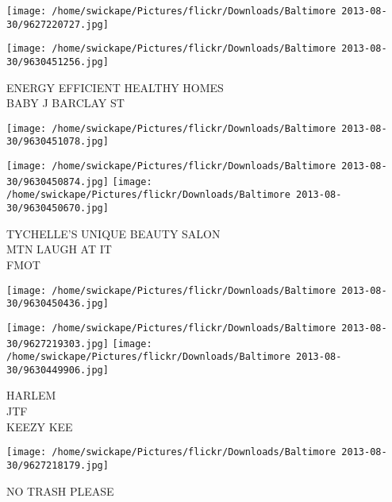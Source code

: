 \documentclass[10pt,letterpaper]{article}
\begin{document}
\texttt{[image: /home/swickape/Pictures/flickr/Downloads/Baltimore 2013-08-30/9627220727.jpg]}

\vspace{0.25in}
\texttt{[image: /home/swickape/Pictures/flickr/Downloads/Baltimore 2013-08-30/9630451256.jpg]}

ENERGY EFFICIENT HEALTHY HOMES\\
BABY J BARCLAY ST\\
\pagebreak

\texttt{[image: /home/swickape/Pictures/flickr/Downloads/Baltimore 2013-08-30/9630451078.jpg]}

\vspace{0.25in}
\texttt{[image: /home/swickape/Pictures/flickr/Downloads/Baltimore 2013-08-30/9630450874.jpg]}
\texttt{[image: /home/swickape/Pictures/flickr/Downloads/Baltimore 2013-08-30/9630450670.jpg]}

TYCHELLE'S UNIQUE BEAUTY SALON\\
MTN LAUGH AT IT\\
FMOT\\
\pagebreak

\texttt{[image: /home/swickape/Pictures/flickr/Downloads/Baltimore 2013-08-30/9630450436.jpg]}

\vspace{0.25in}
\texttt{[image: /home/swickape/Pictures/flickr/Downloads/Baltimore 2013-08-30/9627219303.jpg]}
\texttt{[image: /home/swickape/Pictures/flickr/Downloads/Baltimore 2013-08-30/9630449906.jpg]}

HARLEM\\
JTF\\
KEEZY KEE\\
\pagebreak

\texttt{[image: /home/swickape/Pictures/flickr/Downloads/Baltimore 2013-08-30/9627218179.jpg]}

NO TRASH PLEASE\\
\pagebreak
\end{document}
